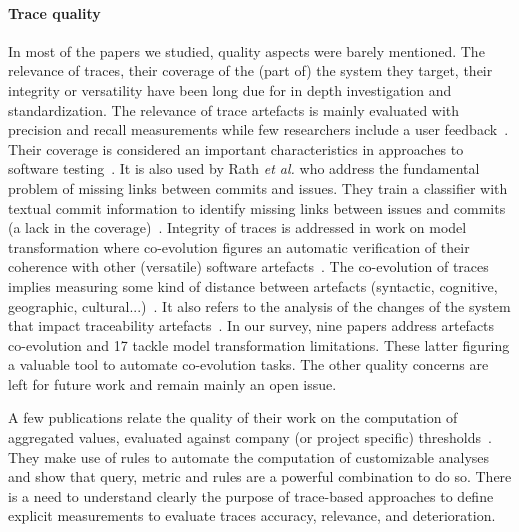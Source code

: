 \paragraph{Trace quality} 
In most of the papers we studied, quality aspects were barely mentioned. The relevance of traces, their coverage of the (part of) the system they target, their integrity or versatility have been long due for in depth investigation and standardization. The relevance of trace artefacts is mainly evaluated with precision and recall measurements while few researchers include a user feedback~\cite{clelandhuang2014-traceability-trends-and-futurte-direction}. Their coverage is considered an important characteristics in approaches to software testing~\cite{gannous2019-Certification-into-Model-based-Testing-for-Safety-Critical-Systems}. It is also used by Rath \textit{et al.} who address the fundamental problem of missing links between commits and issues. They train a classifier with textual commit information to identify missing links between issues and commits (\ie a lack in the coverage)~\cite{rath2018-guo-augmenting-incomplete-traces}. Integrity of traces is addressed in work on model transformation where co-evolution figures an automatic verification of their coherence with other (versatile) software artefacts~\cite{Szabo_2013,slotosch2018-Modeling-and-Certification-of-MDD-Processes}. 
The co-evolution of traces implies measuring some kind of distance between artefacts (syntactic, cognitive, geographic, cultural...)~\cite{bjarnasson20016-theory-of-distances-in-SE}.  It also refers to the analysis of the changes of the system that impact traceability artefacts~\cite{goknil2014-change-impact-analysis-for-requirement-metamodel,vonknethen2002-change-oriented-req-traceability-evolution-of-embedded-systems}. In our survey, nine papers address artefacts co-evolution and 17 tackle model transformation limitations. These latter figuring a valuable tool to automate co-evolution tasks. The other quality concerns are left for future work and remain mainly an open issue.

A few publications relate the quality of their work on the computation of aggregated values, evaluated against company (or project specific) thresholds~\cite{Bunder_2017_query-for-quality}. They make use of rules to automate the computation of customizable analyses and show that query, metric and rules are a powerful combination to do so.
There is a need to understand clearly the purpose of trace-based approaches to define explicit measurements to evaluate traces accuracy, relevance, and deterioration.

